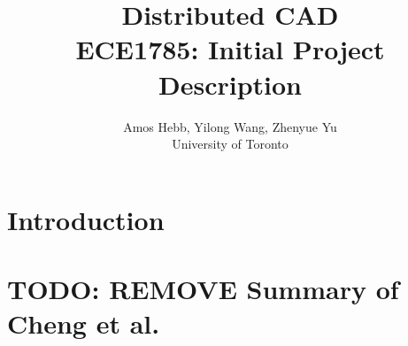 \documentclass[journal,12pt,onecolumn,]{IEEEtran}
\begin{document}
\title{Distributed CAD\\
{\normalsize ECE1785: Initial Project Description}}

\author{Amos Hebb, Yilong Wang, Zhenyue Yu\\ \small University of Toronto}

\maketitle





\section{Introduction}


\section{TODO: REMOVE Summary of Cheng et al.}
\end{document}
